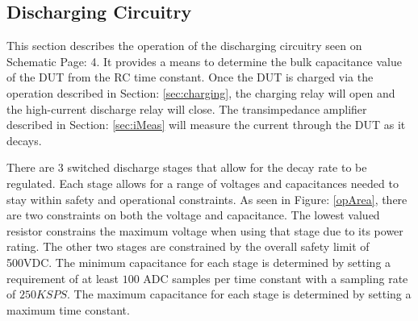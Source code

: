 \subsection{Discharging Circuitry}

This section describes the operation of the discharging circuitry seen on Schematic Page: 4. It provides a means to determine the bulk capacitance value of the DUT from the RC time constant. Once the DUT is charged via the operation described in Section: \ref{sec:charging}, the charging relay will open and the high-current discharge relay will close. The transimpedance amplifier described in Section: \ref{sec:iMeas} will measure the current through the DUT as it decays.

There are 3 switched discharge stages that allow for the decay rate to be regulated. Each stage allows for a range of voltages and capacitances needed to stay within safety and operational constraints. As seen in Figure: \ref{opArea}, there are two constraints on both the voltage and capacitance. The lowest valued resistor constrains the maximum voltage when using that stage due to its power rating. The other two stages are constrained by the overall safety limit of 500VDC. The minimum capacitance for each stage is determined by setting a requirement of at least $100$ ADC samples per time constant with a sampling rate of $250KSPS$. The maximum capacitance for each stage is determined by setting a maximum time constant.



